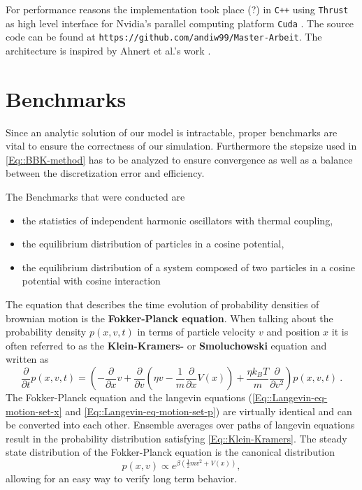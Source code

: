 	For performance reasons the implementation took place (?) in \texttt{C++} using \texttt{Thrust} \cite{thrust} as high level interface for Nvidia's parallel computing platform \texttt{Cuda} \cite{cuda}. The source code can be found at \texttt{https://github.com/andiw99/Master-Arbeit}. The architecture is inspired by Ahnert et al.'s work \cite{ahnert2014solving}.
	\section{Benchmarks}
	Since an analytic solution of our model is intractable, proper benchmarks are vital to ensure the correctness of our simulation. Furthermore the stepsize used in \autoref{Eq::BBK-method} has to be analyzed to ensure convergence as well as a balance between the discretization error and efficiency.
	
	The Benchmarks that were conducted are
	\begin{itemize}
		\item the statistics of independent harmonic oscillators with thermal coupling,
		\item the equilibrium distribution of particles in a cosine potential,
		\item the equilibrium distribution of a system composed of two particles in a cosine potential with cosine interaction
	\end{itemize}
	The equation that describes the time evolution of probability densities of brownian motion is the \textbf{Fokker-Planck equation}. When talking about the probability density $p(x, v, t)$ in terms of particle velocity $v$ and position $x$ it is often referred to as the \textbf{Klein-Kramers-} or \textbf{Smoluchowski} equation and written as
	\begin{equation} \label{Eq::Klein-Kramers}
		\frac{\partial}{\partial t} p(x, v, t) = \left(-\frac{\partial}{\partial x} v + \frac{\partial}{\partial v} \left(\eta v - \frac{1}{m} \frac{\partial}{\partial x} V(x) \right) + \frac{\eta k_B T}{m} \frac{\partial}{\partial v^2}\right)p(x, v, t) ~.
	\end{equation}
	The Fokker-Planck equation and the langevin equations (\autoref{Eq::Langevin-eq-motion-set-x} and \autoref{Eq::Langevin-eq-motion-set-p}) are virtually identical and can be converted into each other. Ensemble averages over paths of langevin equations result in the probability distribution satisfying \autoref{Eq::Klein-Kramers}. The steady state distribution of the Fokker-Planck equation is the canonical distribution
	\begin{equation} \label{Eq::Canonical-Dist}
		p(x, v) \propto e^{\beta \left( \tfrac{1}{2} m v^2 + V(x)\right)},
	\end{equation}
	allowing for an easy way to verify long term behavior.
